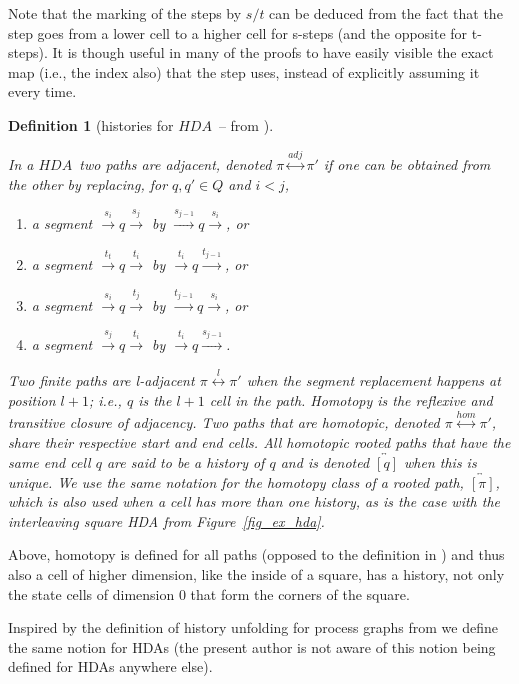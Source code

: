 \documentclass[submission,copyright,creativecommons]{eptcs}
\newtheorem{definition}[theorem]{Definition}
\newcounter{case}
\newcommand\HDA{\ensuremath{\mathit{HDA}}}
\newcommand\homotopyClass[1]{\ensuremath{\overleftrightarrow{[#1]}}}
\newcommand\adjacentHDA{\ensuremath{\!\stackrel{adj}{\longleftrightarrow}\!}}
\newcommand\ladjacentHDA[1]{\ensuremath{\!\stackrel{#1}{\longleftrightarrow}\!}}
\newcommand\homotopicHDA{\ensuremath{\!\stackrel{hom}{\longleftrightarrow}\!}}
\newcommand{\transition}[1]{\ensuremath{\xrightarrow{#1}}}
\begin{document}
Note that the marking of the steps by $s/t$ can be deduced from the fact that the step goes from a lower cell to a higher cell for s-steps (and the opposite for t-steps). It is though useful in many of the proofs to have easily visible the exact map (i.e., the index also) that the step uses, instead of explicitly assuming it every time.

\begin{definition}[histories for \HDA\ -- from {\cite[Sec.7]{Glabbeek06HDA}}]\label{def_history_HDA}\ 

In a \HDA\ two paths are \emph{adjacent}, denoted $\pi\adjacentHDA\pi'$ if one can be obtained from the other by replacing, for $q,q'\in Q$ and $i<j$,
\begin{enumerate}
\item a segment $\transition{s_{i}}q\transition{s_{j}}$ by $\transition{s_{j-1}}q\transition{s_{i}}$, or
\item a segment $\transition{t_{t}}q\transition{t_{i}}$ by $\transition{t_{i}}q\transition{t_{j-1}}$, or
\item a segment $\transition{s_{i}}q\transition{t_{j}}$ by $\transition{t_{j-1}}q\transition{s_{i}}$, or
\item a segment $\transition{s_{j}}q\transition{t_{i}}$ by $\transition{t_{i}}q\transition{s_{j-1}}$.
\end{enumerate}
Two finite paths are \textit{l-adjacent} $\pi\ladjacentHDA{l}\pi'$ when the segment replacement happens at position $l+1$; i.e., $q$ is the $l+1$ cell in the path.
\emph{Homotopy} is the reflexive and transitive closure of adjacency. Two paths that are homotopic, denoted $\pi\homotopicHDA\pi'$, share their respective start and end cells. All homotopic rooted paths that have the same end cell $q$ are said to be a \emph{history of $q$} and is denoted $\homotopyClass{q}$ when this is unique. We use the same notation for the homotopy class of a rooted path, $\homotopyClass{\pi}$, which is also used when a cell has more than one history, as is the case with the interleaving square HDA from Figure~\ref{fig_ex_hda}.
\end{definition}

Above, homotopy is defined for all paths (opposed to the definition in \cite[Sec.1.6]{Goubault12Category_Cubical}) and thus also a cell of higher dimension, like the inside of a square, has a history, not only the state cells of dimension $0$ that form the corners of the square.

Inspired by the definition of history unfolding for process graphs from \cite[Sec.3]{glabbeek96histUnfold} we define the same notion for HDAs (the present author is not aware of this notion being defined for HDAs anywhere else).
\end{document}
